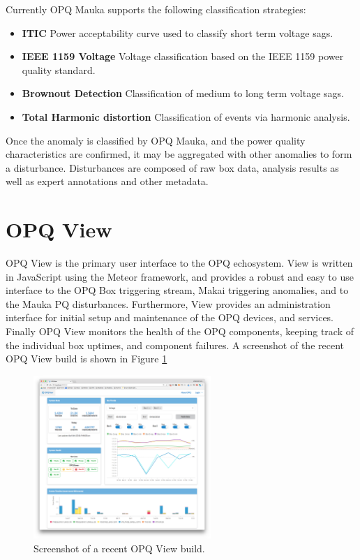 Currently OPQ Mauka supports the following classification strategies: 
\begin{itemize}
	\item{\textbf{ITIC}} Power acceptability curve used to classify short term voltage sags.
	\item{\textbf{IEEE 1159 Voltage}} Voltage classification based on the IEEE 1159 power quality standard.
	\item{\textbf{Brownout Detection}} Classification of medium to long term voltage sags.
	\item{\textbf{Total Harmonic distortion}} Classification of events via harmonic analysis.
\end{itemize}

Once the anomaly is classified by OPQ Mauka, and the power quality characteristics are confirmed, it may be aggregated with other anomalies to form a disturbance. Disturbances are composed of raw box data, analysis results as well as expert annotations and other metadata.

\section{OPQ View}

OPQ View is the primary user interface to the OPQ echosystem. View is written in JavaScript using the Meteor framework, and provides a robust and easy to use interface to the OPQ Box triggering stream, Makai triggering anomalies, and to the Mauka PQ disturbances. Furthermore, View provides an administration interface for initial setup and maintenance of the OPQ devices, and services. Finally OPQ View monitors the health of the OPQ components, keeping track of the individual box uptimes, and component failures. A screenshot of the recent OPQ View build is shown in Figure \ref{fig:9}

\begin{figure}[h]
  \begin{center}
  \includegraphics[width=0.6\textwidth]{img/opqview-landing-page.png}
  \end{center}
  \caption{Screenshot of a recent OPQ View build.}
  \label{fig:9}
\end{figure}
